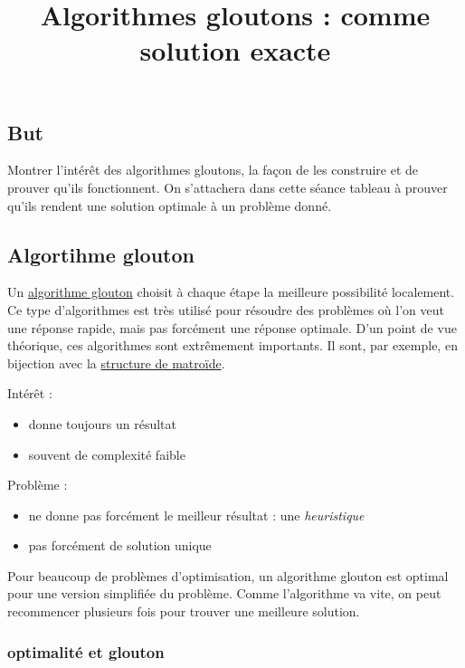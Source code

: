 \documentclass[
]{article}
\title{Algorithmes gloutons : comme solution exacte}
\author{}
\date{}
\providecommand{\tightlist}{%
  \setlength{\itemsep}{0pt}\setlength{\parskip}{0pt}}
\begin{document}
\maketitle

\hypertarget{but}{%
\subsection{But}\label{but}}

Montrer l'intérêt des algorithmes gloutons, la façon de les construire
et de prouver qu'ils fonctionnent. On s'attachera dans cette séance
tableau à prouver qu'ils rendent une solution optimale à un problème
donné.

\hypertarget{algortihme-glouton}{%
\subsection{Algortihme glouton}\label{algortihme-glouton}}

Un \href{https://fr.wikipedia.org/wiki/Algorithme_glouton}{algorithme
glouton} choisit à chaque étape la meilleure possibilité localement. Ce
type d'algorithmes est très utilisé pour résoudre des problèmes où l'on
veut une réponse rapide, mais pas forcément une réponse optimale. D'un
point de vue théorique, ces algorithmes sont extrêmement importants. Il
sont, par exemple, en bijection avec la
\href{https://fr.wikipedia.org/wiki/Matro\%C3\%AFde}{structure de
matroïde}.

Intérêt :

\begin{itemize}
\tightlist
\item
  donne toujours un résultat
\item
  souvent de complexité faible
\end{itemize}

Problème :

\begin{itemize}
\tightlist
\item
  ne donne pas forcément le meilleur résultat : une \emph{heuristique}
\item
  pas forcément de solution unique
\end{itemize}

Pour beaucoup de problèmes d'optimisation, un algorithme glouton est
optimal pour une version simplifiée du problème. Comme l'algorithme va
vite, on peut recommencer plusieurs fois pour trouver une meilleure
solution.

\hypertarget{optimalituxe9-et-glouton}{%
\subsubsection{optimalité et glouton}\label{optimalituxe9-et-glouton}}
\end{document}
